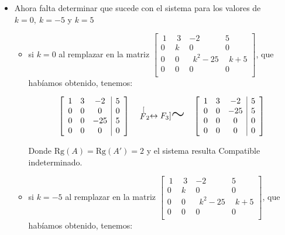 \documentclass[11pt]{article}
\newcommand{\semejante}[1]{\stackrel[#1]{}{\text{\huge$\sim$}}}%
\begin{document}
\begin{enumerate}[\hspace{-5mm} 1) ]
\begin{enumerate}[a)]
\begin{itemize}
\begin{minipage}{.515\textwidth}
\bigskip


\noindent
Se resuelve por complemento:


\[
k^2-25 = 0 
\quad \Leftrightarrow \quad
k^5 = 25
\quad \Leftrightarrow \quad
|k| =5
\]

\hfill$ k= 5 \text{ o } k=-5$ 
\end{minipage}



\bigskip



\noindent
$\therefore$ 
El sistema es Compatible Determinado $\forall\ k \in \mathbb{R} - \{-5,0,5\}\,  $


\bigskip 


\item Ahora falta determinar que sucede con el sistema para los valores de $k=0 ,\ k= -5$ y $k= 5$





\begin{itemize}
    \item si $k=0 $ al remplazar en la  matriz  $
    \left[\begin{smallmatrix}
\  1 \   &\  3\  & -2 & 5\\[1mm]
0 & k & 0 & 0\\[1mm]
0 & 0 & \ \ k^2-25 & \ \ k+5\\[1mm]
0 & 0 & 0 & 0\\
\end{smallmatrix}
\right]  
$, que habíamos obtenido, tenemos: 


    $$
    \left[\begin{array}{rrc|c}
1 & 3 & -2 & 5\\
0 & 0 & 0 & 0\\
0 & 0 &  -25 & 5\\
0 & 0 & 0 & 0
\end{array}
\right]  
\quad
\semejante{ F_2 \leftrightarrow F_3}
\quad
\left[\begin{array}{rrc|c}
1 & 3 & -2 & 5\\
0 & 0 &  -25 & 5\\
0 & 0 & 0 & 0\\
0 & 0 & 0 & 0
\end{array}
\right]  
$$

Donde $ \text{Rg}(A) = \text{Rg}(A')= 2$ y el sistema resulta  Compatible indeterminado. 
\bigskip 


 



\item si $k=-5$ al remplazar en la  matriz  $
    \left[\begin{smallmatrix}
\  1 \   &\  3\  & -2 & 5\\[1mm]
0 & k & 0 & 0\\[1mm]
0 & 0 & \ \ k^2-25 & \ \ k+5\\[1mm]
0 & 0 & 0 & 0\\
\end{smallmatrix}
\right] 
$, que habíamos obtenido, tenemos: 


\end{itemize}
\end{itemize}
\end{enumerate}
\end{enumerate}
\end{document}
